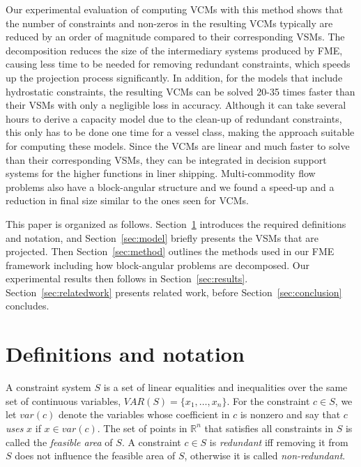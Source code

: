 \documentclass{llncs}
\newcommand{\var}{\mathit{var}}
\newcommand{\VAR}{\mathit{VAR}}
\begin{document}
Our experimental evaluation of computing VCMs with this method shows that the number of constraints and non-zeros in the resulting VCMs typically are reduced by an order of magnitude compared to their corresponding VSMs. The decomposition reduces the size of the intermediary systems produced by FME, causing less time to be needed for removing redundant constraints, which speeds up the projection process significantly. In addition, for the models that include hydrostatic constraints, the resulting VCMs can be solved 20-35 times faster than their VSMs with only a negligible loss in accuracy. Although it can take several hours to derive a capacity model due to the clean-up of redundant constraints, this only has to be done one time for a vessel class, making the approach suitable for computing these models. Since the VCMs are linear and much faster to solve than their corresponding VSMs, they can be integrated in decision support systems for the higher functions in liner shipping. Multi-commodity flow problems also have a block-angular structure and we found a speed-up and a reduction in final size similar to the ones seen for VCMs.

This paper is organized as follows. Section~\ref{sec:notation} introduces the required definitions and notation, %
and Section~\ref{sec:model} briefly presents the VSMs that are projected. Then Section~\ref{sec:method} outlines the methods used in our FME framework including how block-angular problems are decomposed. Our experimental results then follows in Section~\ref{sec:results}. Section~\ref{sec:relatedwork} presents related work, before Section~\ref{sec:conclusion} concludes.
\section{Definitions and notation} \label{sec:notation}
A constraint system $S$ is a set of linear equalities and inequalities over the same set of continuous variables, $\VAR(S)=\{x_1,\ldots, x_n\}$.  
For the constraint $c\in S$, we let $\var(c)$ denote the variables whose coefficient in $c$ is nonzero and say that $c$ \emph{uses} $x$ if $x\in \var(c)$. 
The set of points in $\mathbb{R}^n$ that satisfies all constraints in $S$ is called the \emph{feasible area} of $S$. A constraint $c\in S$ is \emph{redundant} iff removing it from $S$ does not influence the feasible area of $S$, otherwise it is called \emph{non-redundant}.  
\end{document}
